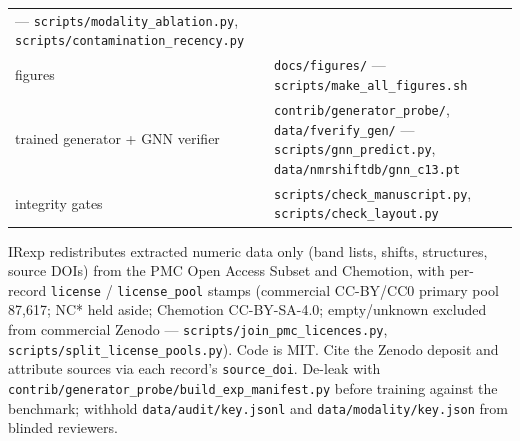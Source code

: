 \documentclass[
  10pt,
]{article}
\begin{document}
\begin{table}[htbp]
\begin{tabular}{@{}
  >{\raggedright\arraybackslash}p{}
  >{\raggedright\arraybackslash}p{}@{}}
--- \texttt{scripts/\hspace{0pt}modality\_\hspace{0pt}ablation.py},
\texttt{scripts/\hspace{0pt}contamination\_\hspace{0pt}recency.py} \\
figures & \texttt{docs/\hspace{0pt}figures/} ---
\texttt{scripts/\hspace{0pt}make\_\hspace{0pt}all\_\hspace{0pt}figures.sh} \\
trained generator + GNN verifier &
\texttt{contrib/\hspace{0pt}generator\_\hspace{0pt}probe/},
\texttt{data/\hspace{0pt}fverify\_gen/} ---
\texttt{scripts/\hspace{0pt}gnn\_\hspace{0pt}predict.py},
\texttt{data/\hspace{0pt}nmrshiftdb/\hspace{0pt}gnn\_\hspace{0pt}c13.pt} \\
integrity gates &
\texttt{scripts/\hspace{0pt}check\_\hspace{0pt}manuscript.py},
\texttt{scripts/\hspace{0pt}check\_\hspace{0pt}layout.py} \\
\bottomrule
\end{tabular}
\end{table}


IRexp redistributes extracted numeric data only (band lists, shifts,
structures, source DOIs) from the PMC Open Access Subset and Chemotion,
with per-record \texttt{license} / \texttt{license\_pool} stamps
(commercial CC-BY/CC0 primary pool 87,617; NC* held aside; Chemotion
CC-BY-SA-4.0; empty/unknown excluded from commercial Zenodo ---
\texttt{scripts/\hspace{0pt}join\_pmc\_licences.py},
\texttt{scripts/\hspace{0pt}split\_license\_pools.py}). Code is MIT.
Cite the Zenodo deposit and attribute sources via each record's
\texttt{source\_doi}. De-leak with
\texttt{contrib/\hspace{0pt}generator\_probe/\hspace{0pt}build\_exp\_manifest.py}
before training against the benchmark; withhold
\texttt{data/\hspace{0pt}audit/\hspace{0pt}key.jsonl} and
\texttt{data/\hspace{0pt}modality/\hspace{0pt}key.json} from blinded
reviewers.
\end{document}
